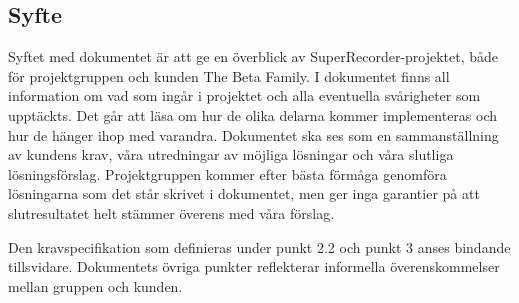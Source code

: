 \subsection{Syfte}

Syftet med dokumentet är att ge en överblick av SuperRecorder-projektet, både för projektgruppen och kunden The Beta Family. I dokumentet finns all information om vad som ingår i projektet och alla eventuella svårigheter som upptäckts. Det går att läsa om hur de olika delarna kommer implementeras och hur de hänger ihop med varandra. Dokumentet ska ses som en sammanställning av kundens krav, våra utredningar av möjliga lösningar och våra slutliga lösningsförslag. Projektgruppen kommer efter bästa förmåga genomföra lösningarna som det står skrivet i dokumentet, men ger inga garantier på att slutresultatet helt stämmer överens med våra förslag.

Den kravspecifikation som definieras under punkt 2.2 och punkt 3 anses bindande tillsvidare. Dokumentets övriga punkter reflekterar informella överenskommelser mellan gruppen och kunden.